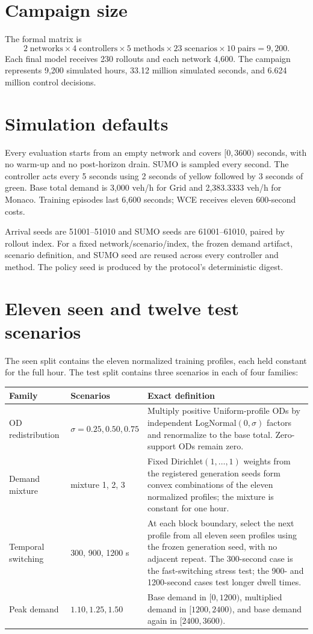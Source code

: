 \section{Campaign size}

The formal matrix is
\[
2\;\text{networks}\times4\;\text{controllers}\times5\;\text{methods}\times23\;\text{scenarios}\times10\;\text{pairs}=9{,}200.
\]
Each final model receives 230 rollouts and each network 4,600. The campaign represents 9,200 simulated hours, 33.12 million simulated seconds, and 6.624 million control decisions.

\section{Simulation defaults}
Every evaluation starts from an empty network and covers $[0,3600)$ seconds, with no warm-up and no post-horizon drain. SUMO is sampled every second. The controller acts every 5 seconds using 2 seconds of yellow followed by 3 seconds of green. Base total demand is 3,000 veh/h for Grid and 2,383.3333 veh/h for Monaco. Training episodes last 6,600 seconds; WCE receives eleven 600-second costs.

Arrival seeds are 51001--51010 and SUMO seeds are 61001--61010, paired by rollout index. For a fixed network/scenario/index, the frozen demand artifact, scenario definition, and SUMO seed are reused across every controller and method. The policy seed is produced by the protocol's deterministic digest.

\section{Eleven seen and twelve test scenarios}
The seen split contains the eleven normalized training profiles, each held constant for the full hour. The test split contains three scenarios in each of four families:

\begin{longtable}{@{}p{}p{}p{}@{}}
\toprule
Family & Scenarios & Exact definition \\
\midrule
OD redistribution & $\sigma=0.25,0.50,0.75$ & Multiply positive Uniform-profile ODs by independent LogNormal$(0,\sigma)$ factors and renormalize to the base total. Zero-support ODs remain zero.\\
Demand mixture & mixture 1, 2, 3 & Fixed Dirichlet$(1,\ldots,1)$ weights from the registered generation seeds form convex combinations of the eleven normalized profiles; the mixture is constant for one hour.\\
Temporal switching & 300, 900, 1200 s & At each block boundary, select the next profile from all eleven seen profiles using the frozen generation seed, with no adjacent repeat. The 300-second case is the fast-switching stress test; the 900- and 1200-second cases test longer dwell times.\\
Peak demand & $1.10,1.25,1.50$ & Base demand in $[0,1200)$, multiplied demand in $[1200,2400)$, and base demand again in $[2400,3600)$.\\
\bottomrule
\end{longtable}

